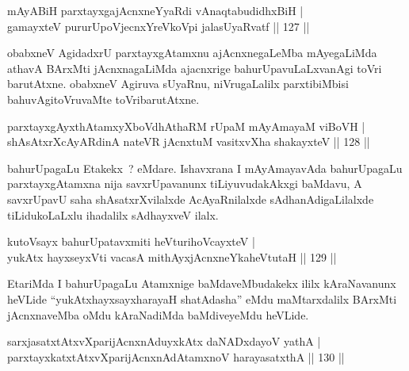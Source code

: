 
\begin{shl}
mAyABiH parxtayxgajAcnxneYyaRdi vA\s naqtabudidhxBiH |\\
gamayxteV pururUpoV\s jecnxYreVkoV\s pi jalasUyaRvatf \hfill || 127 ||
\end{shl}

\begin{artha}
obabxneV AgidadxrU parxtayxgAtamxnu ajAcnxnegaLeMba mAyegaLiMda athavA BArxMti jAcnxnagaLiMda ajacnxrige bahurUpavuLaLxvanAgi toVri barutAtxne. obabxneV Agiruva sUyaRnu, niVrugaLalilx  parxtibiMbisi bahuvAgitoVruvaMte toVribarutAtxne.
\end{artha}

\begin{shl}
parxtayxgAyxthAtamxyXboVdhAthaRM rUpaM mAyAmayaM viBoVH |\\
shAsAtxrXcAyARdinA nateVR jAcnxtuM vasitxvXha shakayxteV \hfill || 128 ||
\end{shl}	

\begin{artha}
bahurUpagaLu Etakekx~? eMdare. Ishavxrana I mAyAmayavAda bahurUpagaLu parxtayxgAtamxna nija savxrUpavanunx tiLiyuvudakAkxgi baMdavu, A savxrUpavU saha shAsatxrXvilalxde AcAyaRnilalxde sAdhanAdigaLilalxde tiLidukoLaLxlu ihadalilx sAdhayxveV ilalx.
\end{artha}


\begin{shl}
kutoV\s sayx bahurUpatavxmiti heVturihoVcayxteV |\\
yukAtx hayxseyxVti vacasA mithAyxjAcnxneYkaheVtutaH \hfill || 129 ||
\end{shl}

\begin{artha}
EtariMda I bahurUpagaLu Atamxnige baMdaveMbudakekx ililx kAraNavanunx heVLide ``yukAtxhayxsayxharayaH shatAdasha'' eMdu maMtarxdalilx BArxMti jAcnxnaveMba oMdu kAraNadiMda baMdiveyeMdu heVLide.
\end{artha}

\begin{shl}
sarxjasatxtAtxvXparijAcnxnAduyxkAtx daNADxdayoV yathA |\\
parxtayxkatxtAtxvXparijAcnxnAdAtamxnoV harayasatxthA \hfill || 130 ||
\end{shl}

